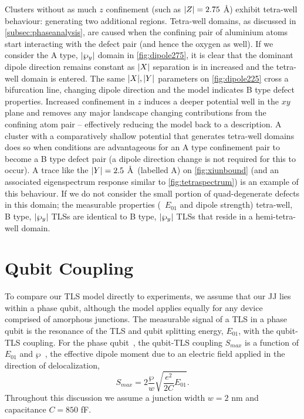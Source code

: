 Clusters without as much $z$ confinement (such as $\lvert Z\rvert = 2.75$ \AA) exhibit tetra-well behaviour: generating two additional regions.
Tetra-well domains, as discussed in \cref{subsec:phaseanalysis}, are caused when the confining pair of aluminium atoms start interacting with the defect pair (and hence the oxygen as well).
If we consider the A type, $\lvert\wp_y\rvert$ domain in \cref{fig:dipole275}, it is clear that the dominant dipole direction remains constant as $\lvert X\rvert$ separation is in increased and the tetra-well domain is entered.
The same $\lvert X\rvert,\lvert Y\rvert$ parameters on \cref{fig:dipole225} cross a bifurcation line, changing dipole direction and the model indicates B type defect properties.
Increased confinement in $z$ induces a deeper potential well in the $xy$ plane and removes any major landscape changing contributions from the confining atom pair -- effectively reducing the model back to a  description.
A cluster with a comparatively shallow potential that generates tetra-well domains does so when conditions are advantageous for an A type confinement pair to become a B type defect pair (a dipole direction change is not required for this to occur).
A trace like the $\lvert Y\rvert = 2.5$ \AA\ (labelled A) on \cref{fig:xiunbound} (and an associated eigenspectrum response similar to \cref{fig:tetraspectrum}) is an example of this behaviour.
If we do not consider the small portion of quad-degenerate defects in this domain; the measurable properties (\ie\ $E_{01}$ and dipole strength) tetra-well, B type, $\lvert\wp_y\rvert$ TLSs are identical to B type, $\lvert\wp_y\rvert$ TLSs that reside in a hemi-tetra-well domain.


\section{Qubit Coupling}\label{sec:smax}

To compare our TLS model directly to experiments, we assume that our JJ lies within a phase qubit, although the model applies equally for any device comprised of amorphous junctions.
The measurable signal of a TLS in a phase qubit is the resonance of the TLS and qubit splitting energy, $E_{01}$, with the qubit-TLS coupling.
For the phase qubit~\cite{Martinis2005}, the qubit-TLS coupling $S_{max}$ is a function of $E_{01}$ and $\wp$~\cite{Kofman2007}, the effective dipole moment due to an electric field applied in the direction of delocalization,
\begin{equation}
    S_{max}=2\frac{\wp}{w}\sqrt{\frac{e^2}{2C}E_{01}}.
\label{eq:smax}
\end{equation}
Throughout this discussion we assume a junction width $w = 2$ nm and capacitance $C = 850$ fF.

